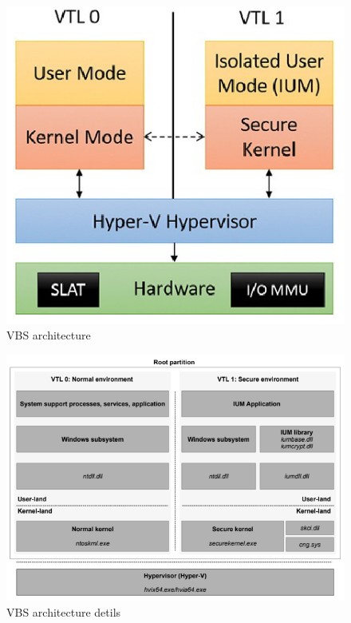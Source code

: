 \begin{figure}[!ht]
    \includegraphics[width=\linewidth]{knowledge/internals/images/vbs-archi.png}
    \caption{VBS architecture}
    \label{fig:vbs_archi}
\end{figure}

\begin{figure}[!ht]
    \includegraphics[width=\linewidth]{knowledge/internals/images/vbs-archi-detailed.png}
    \caption{VBS architecture detils}
    \label{fig:vbs_archi_detailed}
\end{figure}


